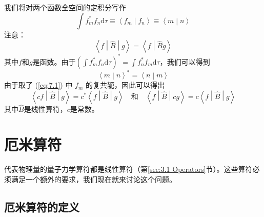     我们将对两个函数全空间的定积分写作
    \begin{equation}
        \int f^{\ast}_m f_n \mathrm{d}\tau \equiv \left\langle f_m \middle| f_n \right\rangle \equiv \left\langle m \middle| n \right\rangle
        \label{eq:7.3}
    \end{equation}
    注意：
    \begin{equation*}
        \left\langle f \middle| \hat{B} \middle| g \right\rangle = \left\langle f \middle| \hat{B} g \right\rangle
    \end{equation*}
    其中$f$和$g$是函数。由于$\left(\int f^{\ast}_mf_n\mathrm{d}\tau\right)^{\ast} = \int f^{\ast}_nf_m\mathrm{d}\tau$，我们可以得到
    \begin{equation}
        \boxed{
            \left\langle m \middle| n \right\rangle^{\ast} = \left\langle n \middle| m \right\rangle
        }
        \label{eq:7.4}
    \end{equation}
    由于取了 (\ref{eq:7.1}) 中 $f_m$ 的复共轭，因此可以得出
    \begin{equation}
        \boxed{
            \left\langle cf \middle| \hat{B} \middle| g \right\rangle = c^{\ast} \left\langle f \middle| \hat{B} \middle| g \right\rangle \quad \text{和} \quad \left\langle f \middle| \hat{B} \middle| cg \right\rangle = c \left\langle f \middle| \hat{B} \middle| g \right\rangle
        }
        \label{eq:7.5}
    \end{equation}
    其中$\hat{B}$是线性算符，$c$是常数。

\section{厄米算符}
\label{sec:7.2 Hermitian Operators}
    代表物理量的量子力学算符都是线性算符（第\ref{sec:3.1 Operators}节）。这些算符必须满足一个额外的要求，我们现在就来讨论这个问题。

\subsection*{厄米算符的定义}

